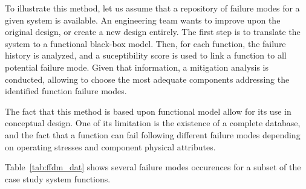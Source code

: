 To illustrate this method, let us assume that a repository of failure modes for a given system is available. An engineering team wants to improve upon the original design, or create a new design entirely. The first step is to translate the system to a functional black-box model. Then, for each function, the failure history is analyzed, and a suceptibility score is used to link a function to all potential failure mode. Given that information, a mitigation analysis is conducted, allowing to choose the most adequate components addressing the identified function failure modes.

The fact that this method is based upon functional model allow for its use in conceptual design. One of its limitation is the existence of a complete database, and the fact that a function can fail following different failure modes depending on operating stresses and component physical attributes.

Table~\ref{tab:ffdm_dat} shows several failure modes occurences for a subset of the case study system functions.


